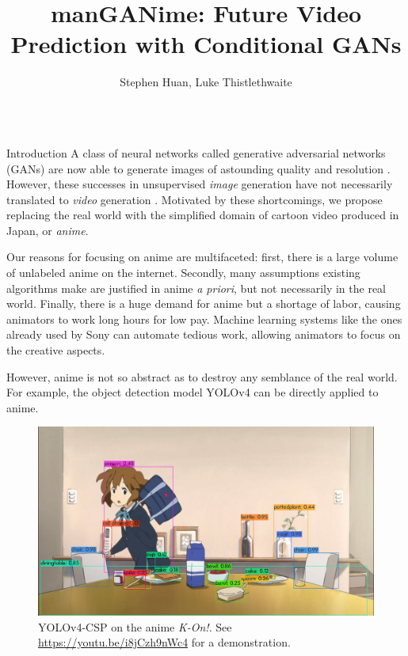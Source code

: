 \documentclass{beamer}                             %
\title[]{\huge manGANime: Future Video Prediction with Conditional GANs}
\subtitle{}
\author[Huan, Thistlethwaite]{\Large Stephen Huan, Luke Thistlethwaite}
\institute[TJHSST]
{
  \large TJHSST Computer Systems Lab, 2020--2021
}
\date[]{}
\begin{document}
\begin{frame}
  \maketitle
  \begin{columns}


    \begin{column}{0.33\textwidth}
      \begin{block}{Introduction} \label{sec:intro}  
        \setlength{\parindent}{1em}
          A class of neural networks called generative adversarial networks
          (GANs) are now able to generate images of astounding quality and
          resolution \cite{stylegan, stylegan2, stylegan2ada}. However,
          these successes in unsupervised \emph{image} generation have not
          necessarily translated to \emph{video} generation \cite{dvdgan}.
          Motivated by these shortcomings, we propose replacing the real
          world with the simplified domain of cartoon video produced in
          Japan, or \emph{anime}.

          Our reasons for focusing on anime are multifaceted: first, there
          is a large volume of unlabeled anime on the internet. Secondly,
          many assumptions existing algorithms \cite{dvdgan, scene} make are
          justified in anime \textit{a priori}, but not necessarily in the
          real world. Finally, there is a huge demand for anime but a shortage
          of labor, causing animators to work long hours for low pay. Machine
          learning systems like the ones already used by Sony can automate
          tedious work, allowing animators to focus on the creative aspects.

          However, anime is not so abstract as to destroy any
          semblance of the real world. For example, the object
          detection model YOLOv4 can be directly applied to anime.

          \begin{figure}[h!]
            \centering
            \includegraphics[scale=0.4,trim={0 0 0 190px},clip]{yolov4}
            \caption{YOLOv4-CSP on the anime \textit{K-On!}. See
              \href{https://youtu.be/i8jCzh9nWc4}{https://youtu.be/i8jCzh9nWc4}
              for a demonstration.}
            \label{fig:object}
          \end{figure}


\end{block}
\end{column}
\end{columns}
\end{frame}
\end{document}
